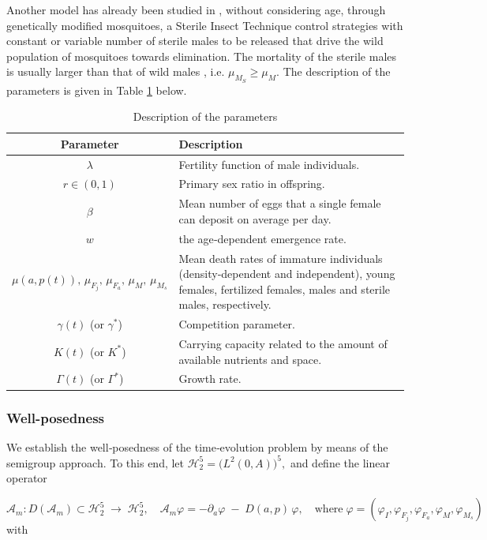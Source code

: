 \documentclass[10pt, a4paper]{amsart}
\theoremstyle{plain}
\theoremstyle{definition}
\theoremstyle{remark}
\numberwithin{equation}{section}
\begin{document}
Another model has already been studied in \cite{ref38,ref42,ref43}, without considering age, through genetically modified mosquitoes, a Sterile Insect Technique control strategies with constant or variable number of sterile males to be released that drive the wild population of mosquitoes towards elimination. The mortality of the sterile males is usually larger than that of wild males \cite{ref73}, i.e. $\mu_{M_S}\geq\mu_M.$  The description of the parameters is given in Table \ref{t1} below.
\begin{table}[ht]
\centering
\begin{tabular}{c|p{10cm}}
\hline
Parameter & Description \\
\hline
$\lambda$ & Fertility function of male individuals. \\
$r \in (0,1)$ & Primary sex ratio in offspring. \\
$\beta$ & Mean number of eggs that a single female can deposit on average per day. \\
$w$ & the age‑dependent emergence rate. \\
$\mu(a,p(t)),\,\mu_{F_j},\,\mu_{F_a},\,\mu_M,\,\mu_{M_s}$ & Mean death rates of immature individuals (density‐dependent and independent), young females, fertilized females, males and sterile males, respectively. \\
$\gamma(t)$ (or $\gamma^*$) & Competition parameter. \\
$K(t)$ (or $K^*$) & Carrying capacity related to the amount of available nutrients and space. \\
$\Gamma(t)$ (or $\Gamma^*$) & Growth rate. \\
\hline
\end{tabular}
\caption{Description of the parameters}
\label{t1}
\end{table}
\subsubsection*{\bf Well-posedness}%
  We establish the well‑posedness of the time‑evolution problem by means of the semigroup approach.  To this end, let $\mathcal H_2^5 = \bigl(L^2(0,A)\bigr)^5,$
  and define the linear operator

 $$
   \mathcal A_m : D(\mathcal A_m)\subset\mathcal H_2^5\;\longrightarrow\;\mathcal H_2^5,
   \quad
   \mathcal A_m\varphi
   = -\partial_a\varphi \;-\; D(a,p)\,\varphi,\quad\text{where}\; \varphi=(\varphi_I,\varphi_{F_j},\varphi_{F_a},\varphi_M,\varphi_{M_s})
 $$
 with
\end{document}
